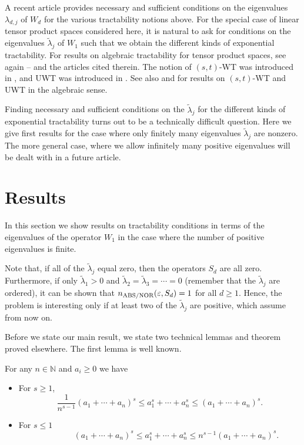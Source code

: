 \documentclass[graybox]{svmult}
\newcommand{\tlambda}{\widetilde{\lambda}}
\newcommand{\NOR}{\textup{NOR}\xspace}
\newcommand{\ABS}{\textup{ABS}\xspace}
\newcommand{\WT}{\textup{WT}\xspace}
\newcommand{\UWT}{\textup{UWT}\xspace}
\newcommand{\N}{{\mathbb{N}}} %
\begin{document}
A recent article \cite{KW18} provides  necessary and sufficient conditions 
on the eigenvalues $\lambda_{d,j}$ of $W_d$ for the various tractability 
notions above. For the special case of linear tensor product spaces 
considered here, it is natural 
to ask for conditions on the eigenvalues $\tlambda_j$ of $W_1$ such that we obtain 
the different kinds of exponential tractability. For results on algebraic tractability 
for tensor product spaces, see again \cite{NW08}--\cite{NW12} and the articles cited therein. 
The notion of $(s,t)$-\WT was introduced in \cite{SW15}, and \UWT was introduced in \cite{S13}. 
See also \cite{WW17} and \cite{KW18} for results on $(s,t)$-\WT and \UWT in the algebraic sense.


Finding  
necessary and sufficient conditions on the $\tlambda_j$ for the different kinds of exponential 
tractability turns out to be a technically difficult question. Here we give first results for the case 
where only finitely many eigenvalues $\tlambda_j$ are nonzero. The more general case, 
where we allow infinitely many positive eigenvalues will be dealt with in a future article. 


\section{Results}
\label{sec:results}
 
In this section we show results on tractability conditions in terms of the eigenvalues of the 
operator $W_1$ in the case where the number of positive eigenvalues is finite. 

Note that, if all of the $\tlambda_j$ equal zero, then the operators $S_d$ are all zero. Furthermore, 
if only $\tlambda_1>0$ and $\tlambda_2=\tlambda_3=\cdots =0$ (remember that the $\tlambda_j$ are ordered), 
it can be shown that $n_{\ABS/\NOR}(\varepsilon,S_d)=1$ for all $d\ge 1$. Hence, the problem is 
interesting only if at least two of the $\tlambda_j$ are positive, which assume from now 
on. 

Before we state our main result, we state two technical lemmas and theorem proved elsewhere.  The first lemma is well known.

\begin{lemma} \label{sSumLem}
For any $n \in \N$  and $a_i \ge 0$ we have
\begin{itemize}
\item For $s\ge1$,
\begin{equation*}
\frac1{n^{s-1}} (a_1 + \cdots + a_n)^s
\le a_1^s + \cdots + a_n^s \le
(a_1 + \cdots + a_n)^s.
\end{equation*}
\item For $s\le1$
\begin{equation*}
\qquad
\qquad
(a_1 + \cdots + a_n)^s
\le a_1^s + \cdots + a_n^s \le n^{s-1}(a_1 + \cdots + a_n)^s.
\end{equation*}
\end{itemize}
\end{lemma}
\end{document}
